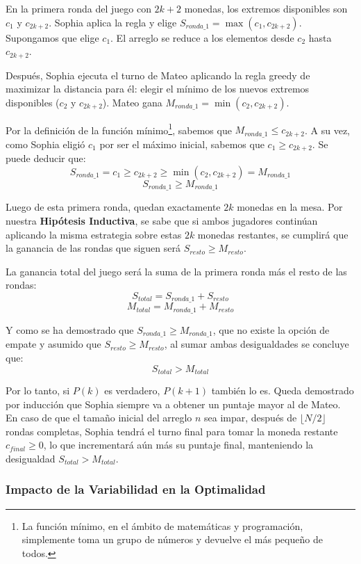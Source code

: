 En la primera ronda del juego con $2k + 2$ monedas, los extremos disponibles son $c_1$ y $c_{2k+2}$.
Sophia aplica la regla y elige $S_{ronda\_1} = \max(c_1, c_{2k+2})$. 
Supongamos que elige $c_1$. El arreglo se reduce a los elementos desde $c_2$ hasta $c_{2k+2}$.

Después, Sophia ejecuta el turno de Mateo aplicando la regla greedy de maximizar la distancia para él: elegir el mínimo de los nuevos extremos disponibles ($c_2$ y $c_{2k+2}$).
Mateo gana $M_{ronda\_1} = \min(c_2, c_{2k+2})$.

Por la definición de la función mínimo\footnote{La función mínimo, en el ámbito de matemáticas y programación, simplemente toma un grupo de números y devuelve el más pequeño de todos.}, sabemos que $M_{ronda\_1} \le c_{2k+2}$. 
A su vez, como Sophia eligió $c_1$ por ser el máximo inicial, sabemos que $c_1 \ge c_{2k+2}$.
Se puede deducir que:
\[ S_{ronda\_1} = c_1 \ge c_{2k+2} \ge \min(c_2, c_{2k+2}) = M_{ronda\_1} \]
\[ S_{ronda\_1} \ge M_{ronda\_1} \]

Luego de esta primera ronda, quedan exactamente $2k$ monedas en la mesa. Por nuestra \textbf{Hipótesis Inductiva}, se sabe que si ambos jugadores continúan aplicando la misma estrategia sobre estas $2k$ monedas restantes, se cumplirá que la ganancia de las rondas que siguen será $S_{resto} \ge M_{resto}$.

La ganancia total del juego será la suma de la primera ronda más el resto de las rondas:
\[ S_{total} = S_{ronda\_1} + S_{resto} \]
\[ M_{total} = M_{ronda\_1} + M_{resto} \]

Y como se ha demostrado que $S_{ronda\_1} \ge M_{ronda\_1}$, que no existe la opción de empate y asumido que $S_{resto} \ge M_{resto}$, al sumar ambas desigualdades se concluye que:
\[ S_{total} > M_{total} \]

Por lo tanto, si $P(k)$ es verdadero, $P(k+1)$ también lo es. Queda demostrado por inducción que Sophia siempre va a obtener un puntaje mayor al de Mateo. En caso de que el tamaño inicial del arreglo $n$ sea impar, después de $\lfloor N/2 \rfloor$ rondas completas, Sophia tendrá el turno final para tomar la moneda restante $c_{final} \ge 0$, lo que incrementará aún más su puntaje final, manteniendo la desigualdad $S_{total} > M_{total}$.

\subsubsection{Impacto de la Variabilidad en la Optimalidad}


